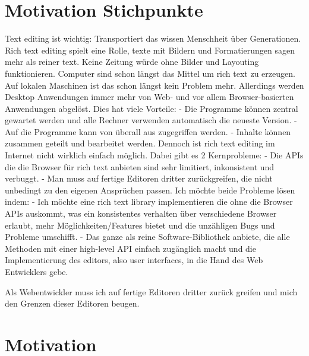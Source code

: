 

\section{Motivation Stichpunkte}

Text editing ist wichtig: Transportiert das wissen Menschheit über Generationen.
Rich text editing spielt eine Rolle, texte mit Bildern und Formatierungen sagen mehr als reiner text. Keine Zeitung würde ohne Bilder und Layouting funktionieren.
Computer sind schon längst das Mittel um rich text zu erzeugen.
Auf lokalen Maschinen ist das schon längst kein Problem mehr.
Allerdings werden Desktop Anwendungen immer mehr von Web- und vor allem Browser-basierten Anwendungen abgelöst.
Dies hat viele Vorteile:
 - Die Programme können zentral gewartet werden und alle Rechner verwenden automatisch die neueste Version.
 - Auf die Programme kann von überall aus zugegriffen werden.
 - Inhalte können zusammen geteilt und bearbeitet werden.
Dennoch ist rich text editing im Internet nicht wirklich einfach möglich.
Dabei gibt es 2 Kernprobleme:
 - Die APIs die die Browser für rich text anbieten sind sehr limitiert, inkonsistent und verbuggt.
 - Man muss auf fertige Editoren dritter zurückgreifen, die nicht unbedingt zu den eigenen Ansprüchen passen.
Ich möchte beide Probleme lösen indem:
 - Ich möchte eine rich text library implementieren die ohne die Browser APIs auskommt, was ein konsistentes verhalten über verschiedene Browser erlaubt, mehr Möglichkeiten/Features bietet und die unzähligen Bugs und Probleme umschifft.
 - Das ganze als reine Software-Bibliothek anbiete, die alle Methoden mit einer high-level API einfach zugänglich macht und die Implementierung des editors, also user interfaces, in die Hand des Web Entwicklers gebe.


Als Webentwickler muss ich auf fertige Editoren dritter zurück greifen und mich den Grenzen dieser Editoren beugen.



\section{Motivation}

